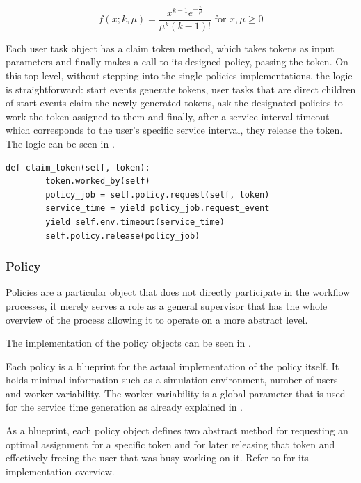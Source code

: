 \documentclass[draft=false]{seal_thesis}
\begin{document}
\begin{equation}
\label{eq:erlang_density}
	f(x;k,\mu) = \frac{x^{k-1} e^{-\frac{x}{\mu}}}{\mu^k (k-1)!} \text{ for } x,\mu \geq 0
\end{equation}

Each user task object has a claim token method, which takes tokens as input parameters and finally makes a call to its designed policy, passing the token. On this top level, without stepping into the single policies implementations, the logic is straightforward: start events generate tokens, user tasks that are direct children of start events claim the newly generated tokens, ask the designated policies to work the token assigned to them and finally, after a service interval timeout which corresponds to the user's specific service interval, they release the token. The logic can be seen in .

\begin{lstlisting}[caption=User task claim method,label=lst:user_task,style=CustomPython]
    def claim_token(self, token):
        token.worked_by(self)
        policy_job = self.policy.request(self, token)
        service_time = yield policy_job.request_event
        yield self.env.timeout(service_time)
        self.policy.release(policy_job)
\end{lstlisting}

\subsubsection{Policy}

Policies are a particular object that does not directly participate in the workflow processes, it merely serves a role as a general supervisor that has the whole overview of the process allowing it to operate on a more abstract level. 

The implementation of the policy objects can be seen in .


Each policy is a blueprint for the actual implementation of the policy itself. It holds minimal information such as a simulation environment, number of users and worker variability. The worker variability is a global parameter that is used for the service time generation as already explained in .

As a blueprint, each policy object defines two abstract method for requesting an optimal assignment for a specific token and for later releasing that token and effectively freeing the user that was busy working on it. Refer to  for its implementation overview.
\end{document}
